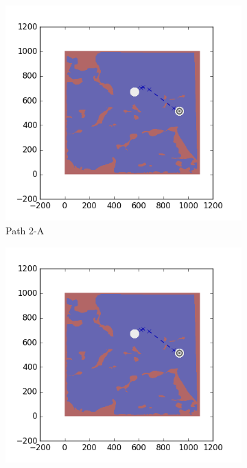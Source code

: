 \documentclass{tamuccthesis}
\begin{document}
\begin{figure}[H]
\begin{subfigure}[b]{0.24\textwidth}
        \includegraphics[width=\textwidth,trim={4cm 3cm 2cm 3cm},clip]{EXP3RG_PathBa_-1_-1_0d01_0d005.png}
        \caption{Path 2-A}
        \label{fig:Path_2-A_upReward_upWork_b}
    \end{subfigure}
    \begin{subfigure}[b]{0.24\textwidth}
        \centering
        \includegraphics[width=\textwidth,trim={4cm 3cm 2cm 3cm},clip]{EXP3RG_PathBa_-1_-1_0d01_0d005.png}

\end{subfigure}
\end{figure}
\end{document}
